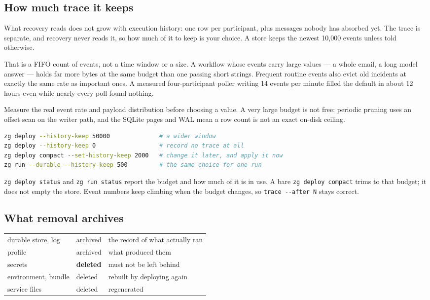 \documentclass[11pt,a4paper]{article}
\begin{document}
\subsection{How much trace it keeps}

What recovery reads does not grow with execution history: one row per
participant, plus messages nobody has absorbed yet. The trace is separate, and
recovery never reads it, so how much of it to keep is your choice. A store keeps
the newest 10,000 events unless told otherwise.

That is a FIFO count of events, not a time window or a size. A workflow whose
events carry large values --- a whole email, a long model answer --- holds far
more bytes at the same budget than one passing short strings. Frequent routine
events also evict old incidents at exactly the same rate as important ones. A
measured four-participant poller writing 14 events per minute filled the default
in about 12 hours even while nearly every poll found nothing.

Measure the real event rate and payload distribution before choosing a value.
A very large budget is not free: periodic pruning uses an offset scan on the
writer path, and the SQLite pages and WAL mean a row count is not an exact
on-disk ceiling.

\begin{lstlisting}[language=bash]
zg deploy --history-keep 50000              # a wider window
zg deploy --history-keep 0                  # record no trace at all
zg deploy compact --set-history-keep 2000   # change it later, and apply it now
zg run --durable --history-keep 500         # the same choice for one run
\end{lstlisting}

\texttt{zg deploy status} and \texttt{zg run status} report the budget and how
much of it is in use. A bare \texttt{zg deploy compact} trims to that budget; it
does not empty the store. Event numbers keep climbing when the budget changes,
so \texttt{trace -{}-after N} stays correct.

\subsection{What removal archives}

\begin{center}
\begin{tabularx}{0.95\linewidth}{@{}llX@{}}
\toprule
durable store, log & archived & the record of what actually ran \\
profile & archived & what produced them \\
secrets & \textbf{deleted} & must not be left behind \\
environment, bundle & deleted & rebuilt by deploying again \\
service files & deleted & regenerated \\
\bottomrule
\end{tabularx}
\end{center}
\end{document}
